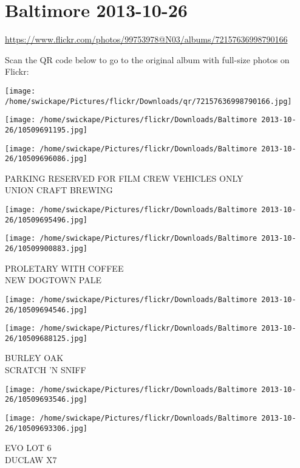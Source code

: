 \documentclass[10pt,letterpaper]{article}
\title{}
\author{}
\date{}
\begin{document}
\section*{Baltimore 2013-10-26}

\url{https://www.flickr.com/photos/99753978@N03/albums/72157636998790166}

Scan the QR code below to go to the original album with full-size photos on Flickr:

\texttt{[image: /home/swickape/Pictures/flickr/Downloads/qr/72157636998790166.jpg]}
\pagebreak

\texttt{[image: /home/swickape/Pictures/flickr/Downloads/Baltimore 2013-10-26/10509691195.jpg]}

\vspace{0.25in}
\texttt{[image: /home/swickape/Pictures/flickr/Downloads/Baltimore 2013-10-26/10509696086.jpg]}

PARKING RESERVED FOR FILM CREW VEHICLES ONLY\\
UNION CRAFT BREWING
\pagebreak

\texttt{[image: /home/swickape/Pictures/flickr/Downloads/Baltimore 2013-10-26/10509695496.jpg]}

\vspace{0.25in}
\texttt{[image: /home/swickape/Pictures/flickr/Downloads/Baltimore 2013-10-26/10509900883.jpg]}

PROLETARY WITH COFFEE\\
NEW DOGTOWN PALE
\pagebreak

\texttt{[image: /home/swickape/Pictures/flickr/Downloads/Baltimore 2013-10-26/10509694546.jpg]}

\vspace{0.25in}
\texttt{[image: /home/swickape/Pictures/flickr/Downloads/Baltimore 2013-10-26/10509688125.jpg]}

BURLEY OAK\\
SCRATCH 'N SNIFF
\pagebreak

\texttt{[image: /home/swickape/Pictures/flickr/Downloads/Baltimore 2013-10-26/10509693546.jpg]}

\vspace{0.25in}
\texttt{[image: /home/swickape/Pictures/flickr/Downloads/Baltimore 2013-10-26/10509693306.jpg]}

EVO LOT 6\\
DUCLAW X7
\pagebreak
\end{document}
